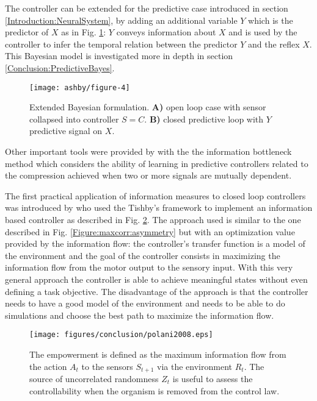 The controller can be extended for the predictive case introduced in section \ref{Introduction:NeuralSystem},
by adding an additional variable $Y$ which is the predictor of $X$ as in Fig. \ref{fig:tishby2}:
$Y$ conveys information about $X$ and is used by the controller to infer the 
temporal relation between the predictor $Y$ and the reflex $X$.
This Bayesian model is investigated more in depth in section \ref{Conclusion:PredictiveBayes}.
\begin{figure}[!htbp]
\begin{center}
 \texttt{[image: ashby/figure-4]}
\caption[Bayes formulation in predictive control]{
Extended Bayesian formulation.
\textbf{A)} open loop case with sensor collapsed into controller $S=C$.
\textbf{B)} closed predictive loop with $Y$ predictive signal on $X$.
\label{fig:tishby2}}
\end{center}
\end{figure}

Other important tools were provided by \citet{Tishby2000:InfoBottle} with the 
the information bottleneck method which considers the ability of learning 
in predictive controllers related to the compression achieved when two or more
signals are mutually dependent.

The first practical application of information measures to closed loop controllers
was introduced by \citet{organizationInfo} who used the Tishby's framework
to implement an information based controller as described in Fig. \ref{fig:conclusion:polani}.
The approach used is similar to the one described in Fig. \ref{Figure:maxcorr:asymmetry} 
but with an optimization value provided by the information flow: the controller's
transfer function is a model of the environment and the goal of the controller
consists in maximizing the information flow from the motor output to the sensory input.
With this very general approach the controller is able to achieve meaningful states
without even defining a task objective.
The disadvantage of the approach is that the controller needs to have a good model
of the environment and needs to be able to do simulations and choose the best
path to maximize the information flow.


\begin{figure}[htbp]
\begin{center}
\texttt{[image: figures/conclusion/polani2008.eps]}
\end{center}
\vspace*{4pt}
\caption[Empowerment from Polani]{
The empowerment is defined as the maximum information flow
from the action $A_{t}$ to the sensors $S_{t+1}$ via the environment $R_{t}$.
The source of uncorrelated randomness $Z_{t}$ is useful to assess the controllability
when the organism is removed from the control law.
\label{fig:conclusion:polani}}
\end{figure}

